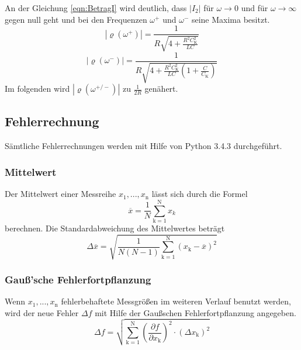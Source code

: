 An der Gleichung \ref{eqn:BetragI} wird deutlich, dass $|I_2|$ für $\omega \to 0$ und für $\omega \to \infty$ gegen null geht und bei den Frequenzen $\omega^+$ und $\omega^-$ seine Maxima besitzt.
\begin{equation}
	|\pmb{\varrho}(\omega^+)| = \frac{1}{R \sqrt{4 + \frac{R^2 C^2_\text{K}}{LC}}}
\end{equation}
\begin{equation}
	|\pmb{\varrho}(\omega^-)| = \frac{1}{R \sqrt{4 + \frac{R^2 C^2_\text{K}}{LC} \left(1 + \frac{C}{C_\text{K}} \right)}}
\end{equation}
Im folgenden wird $|\pmb{\varrho}(\omega^{+/-})|$ zu $\frac{1}{2R}$ genähert.

\subsection{Fehlerrechnung}
Sämtliche Fehlerrechnungen werden mit Hilfe von Python 3.4.3 durchgeführt.
\subsubsection{Mittelwert}
Der Mittelwert einer Messreihe $x_\text{1}, ... ,x_\text{n}$ lässt sich durch die Formel
\begin{equation}
	\overline{x} = \frac{1}{N} \sum_{\text{k}=1}^\text{N} x_k
	\label{eqn:ave}
\end{equation}
berechnen. Die Standardabweichung des Mittelwertes beträgt
\begin{equation}
	\Delta \overline{x} = \sqrt{ \frac{1}{N(N-1)} \sum_{\text{k}=1}^\text{N} (x_\text{k} - \overline{x})^2}
	\label{eqn:std}
\end{equation}

\subsubsection{Gauß'sche Fehlerfortpflanzung}
Wenn $x_\text{1}, ..., x_\text{n}$ fehlerbehaftete Messgrößen im weiteren Verlauf benutzt werden, wird der neue Fehler $\Delta f$ mit Hilfe der Gaußschen Fehlerfortpflanzung angegeben.
\begin{equation}
	\Delta f = \sqrt{\sum_{\text{k}=1}^\text{N} \left( \frac{ \partial f}{\partial x_\text{k}} \right) ^2 \cdot (\Delta x_\text{k})^2}
	\label{eqn:var}
\end{equation}

